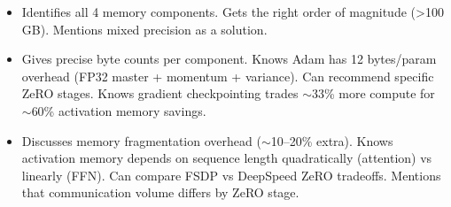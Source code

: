 \begin{interviewq}

\goodgreat
\begin{itemize}
    \item {} Identifies all 4 memory components. Gets the right order of magnitude (>100 GB). Mentions mixed precision as a solution.
    \item {} Gives precise byte counts per component. Knows Adam has 12 bytes/param overhead (FP32 master + momentum + variance). Can recommend specific ZeRO stages. Knows gradient checkpointing trades $\sim$33\% more compute for $\sim$60\% activation memory savings.
    \item {} Discusses memory fragmentation overhead ($\sim$10--20\% extra). Knows activation memory depends on sequence length quadratically (attention) vs linearly (FFN). Can compare FSDP vs DeepSpeed ZeRO tradeoffs. Mentions that communication volume differs by ZeRO stage.
\end{itemize}

\end{interviewq}

